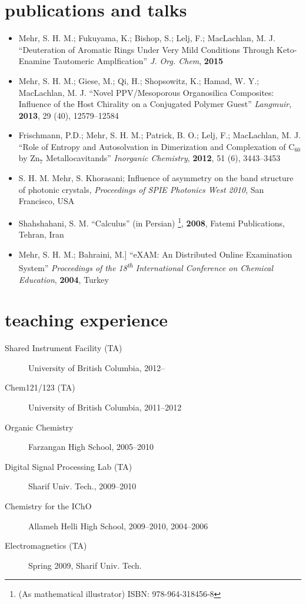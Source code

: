 \documentclass[overlapped,line,10pt,letterpaper]{res}
\begin{document}
\begin{resume}
\section{publications and talks}
\begin{itemize}
\renewcommand{\labelitemi}{$\bullet$}
\item Mehr, S. H. M.; Fukuyama, K.; Bishop, S.; Lelj, F.; MacLachlan, M. J. ``Deuteration of Aromatic Rings Under Very Mild Conditions Through Keto-Enamine  Tautomeric Amplfication'' \emph{J. Org. Chem}, \textbf{2015}
\item  Mehr, S. H. M.; Giese, M.; Qi, H.; Shopsowitz, K.; Hamad, W. Y.; MacLachlan, M. J. ``Novel PPV/Mesoporous Organosilica Composites: Influence of the Host Chirality on a Conjugated Polymer Guest'' \emph{Langmuir}, \textbf{2013}, 29 (40), 12579–12584
\item Frischmann, P.D.; Mehr, S. H. M.; Patrick, B. O.; Lelj, F.; MacLachlan, M. J. ``Role of Entropy and Autosolvation in Dimerization and Complexation of $\mathrm{C_{60}}$ by $\mathrm{Zn_7}$ Metallocavitands'' \emph{Inorganic Chemistry}, \textbf{2012}, 51 (6), 3443–3453
\item S. H. M. Mehr, S. Khorasani; Influence of asymmetry on the band structure of photonic crystals, \emph{Proceedings of SPIE Photonics West 2010}, San Francisco, USA
\item Shahshahani, S. M. ``Calculus'' (in Persian) \footnote{ (As mathematical illustrator) ISBN: 978-964-318456-8}, \textbf{2008}, Fatemi Publications, Tehran, Iran
\item Mehr, S. H. M.; Bahraini, M.] ``eXAM: An Distributed Online Examination System'' \emph{Proceedings of the 18\textsuperscript{th} International Conference on Chemical Education}, \textbf{2004}, Turkey
\end{itemize}




\section{teaching experience}
\begin{description}
\item[Shared Instrument Facility (TA)] University of British Columbia, 2012–
\item[Chem121/123 (TA)] University of British Columbia, 2011–2012
\item[Organic Chemistry] Farzangan High School, 2005–2010
\item[Digital Signal Processing Lab (TA)] Sharif Univ. Tech., 2009–2010
\item[Chemistry for the IChO] Allameh Helli High School, 2009–2010, 2004–2006
\item[Electromagnetics (TA)] Spring 2009, Sharif Univ. Tech.
\end{description}


\end{resume}
\end{document}
